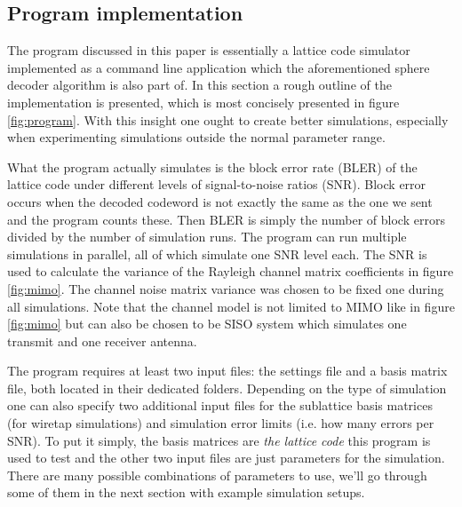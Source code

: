 \documentclass[english,12pt,a4paper,pdftex,sci,utf8]{aaltothesis}
\begin{document}
\subsection{Program implementation}
\label{sec:implement}
The program discussed in this paper is essentially a lattice code simulator implemented as a command line application which the aforementioned sphere decoder algorithm is also part of. In this section a rough outline of the implementation is presented, which is most concisely presented in figure \ref{fig:program}. With this insight one ought to create better simulations, especially when experimenting simulations outside the normal parameter range.
\par What the program actually simulates is the block error rate (BLER) of the lattice code under different levels of signal-to-noise ratios (SNR). Block error occurs when the decoded codeword is not exactly the same as the one we sent and the program counts these. Then BLER is simply the number of block errors divided by the number of simulation runs. The program can run multiple simulations in parallel, all of which simulate one SNR level each. The SNR is used to calculate the variance of the Rayleigh channel matrix coefficients in figure \ref{fig:mimo}. The channel noise matrix variance was chosen to be fixed one during all simulations. Note that the channel model is not limited to MIMO like in figure \ref{fig:mimo} but can also be chosen to be SISO system which simulates one transmit and one receiver antenna.
\par The program requires at least two input files: the settings file and a basis matrix file, both located in their dedicated folders. Depending on the type of simulation one can also specify two additional input files for the sublattice basis matrices (for wiretap simulations) and simulation error limits (i.e. how many errors per SNR). To put it simply, the basis matrices are \textit{the lattice code} this program is used to test and the other two input files are just parameters for the simulation. There are many possible combinations of parameters to use, we'll go through some of them in the next section with example simulation setups.
\end{document}
